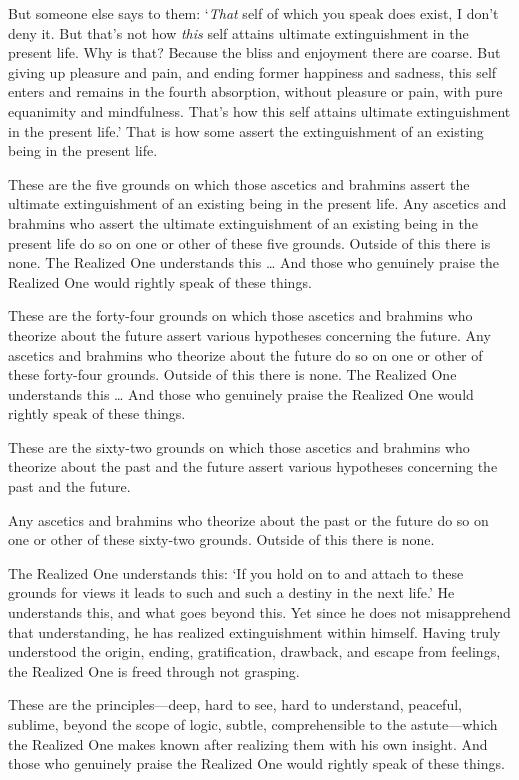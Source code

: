 \documentclass[12pt,openany]{book}%
\begin{document}
But someone else says to them: ‘\emph{That} self of which you speak does exist, I don’t deny it. But that’s not how \emph{this} self attains ultimate extinguishment in the present life. Why is that? Because the bliss and enjoyment there are coarse. But giving up pleasure and pain, and ending former happiness and sadness, this self enters and remains in the fourth absorption, without pleasure or pain, with pure equanimity and mindfulness. That’s how this self attains ultimate extinguishment in the present life.’ That is how some assert the extinguishment of an existing being in the present life. 

These are the five grounds on which those ascetics and brahmins assert the ultimate extinguishment of an existing being in the present life. Any ascetics and brahmins who assert the ultimate extinguishment of an existing being in the present life do so on one or other of these five grounds. Outside of this there is none. The Realized One understands this … And those who genuinely praise the Realized One would rightly speak of these things. 

These are the forty-four grounds on which those ascetics and brahmins who theorize about the future assert various hypotheses concerning the future. Any ascetics and brahmins who theorize about the future do so on one or other of these forty-four grounds. Outside of this there is none. The Realized One understands this … And those who genuinely praise the Realized One would rightly speak of these things. 

These are the sixty-two grounds on which those ascetics and brahmins who theorize about the past and the future assert various hypotheses concerning the past and the future. 

Any ascetics and brahmins who theorize about the past or the future do so on one or other of these sixty-two grounds. Outside of this there is none. 

The Realized One understands this: ‘If you hold on to and attach to these grounds for views it leads to such and such a destiny in the next life.’ He understands this, and what goes beyond this. Yet since he does not misapprehend that understanding, he has realized extinguishment within himself. Having truly understood the origin, ending, gratification, drawback, and escape from feelings, the Realized One is freed through not grasping. 

These are the principles—deep, hard to see, hard to understand, peaceful, sublime, beyond the scope of logic, subtle, comprehensible to the astute—which the Realized One makes known after realizing them with his own insight. And those who genuinely praise the Realized One would rightly speak of these things. 
\end{document}
